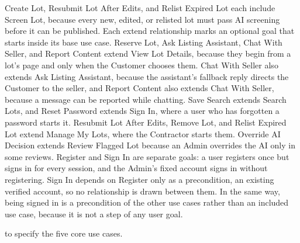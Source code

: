 Create Lot, Resubmit Lot After Edits, and Relist Expired Lot each include Screen Lot,
because every new, edited, or relisted lot must pass AI screening before it can be
published. Each extend relationship marks an optional goal that starts inside its base use
case. Reserve Lot, Ask Listing Assistant, Chat With Seller, and Report Content extend View
Lot Details, because they begin from a lot's page and only when the Customer chooses them.
Chat With Seller also extends Ask Listing Assistant, because the assistant's fallback reply
directs the Customer to the seller, and Report Content also extends Chat With Seller, because
a message can be reported while chatting. Save Search extends Search Lots, and Reset Password
extends Sign In, where a user who has forgotten a password starts it. Resubmit Lot After Edits, Remove Lot, and Relist Expired Lot
extend Manage My Lots, where the Contractor starts them. Override AI Decision extends Review
Flagged Lot because an Admin overrides the AI only in some reviews. Register and Sign In
are separate goals: a user registers once but signs in for every session, and the Admin's
fixed account signs in without registering. Sign In depends on Register only as a
precondition, an existing verified account, so no relationship is drawn between them. In
the same way, being signed in is a precondition of the other use cases rather than an
included use case, because it is not a step of any user goal.

 to  specify the five core use cases.

